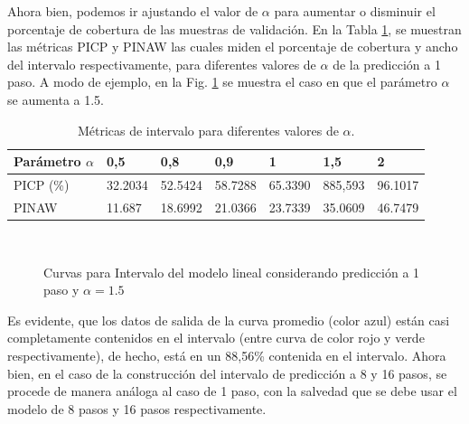 \documentclass[12pt]{article}
\begin{document}
Ahora bien, podemos ir ajustando el valor de $\alpha$ para aumentar o disminuir el porcentaje de cobertura de las muestras de validación. En la Tabla \ref{t_G2}, se muestran las métricas PICP y PINAW las cuales miden el porcentaje de cobertura y ancho del intervalo respectivamente, para diferentes valores de $\alpha$ de la predicción a 1 paso. A modo de ejemplo, en la Fig. \ref{f_G910} se muestra el caso en que el parámetro $\alpha$ se aumenta a 1.5.
\begin{table}[h!]
	\centering
	\caption{Métricas de intervalo para diferentes valores de $\alpha$. }
	\begin{tabular}{|l|l|l|l|l|l|l|}
		\hline
		Parámetro $\alpha$ & 0,5&0,8&0,9&1&1,5&2\\
		\hline
		PICP (\%) & 32.2034 & 52.5424 & 58.7288 & 65.3390 & 885,593 & 96.1017 \\
		\hline
		PINAW & 11.687 & 18.6992 & 21.0366 & 23.7339 & 35.0609 & 46.7479 \\
		\hline
	\end{tabular}%
	\label{t_G2}%
\end{table}
\begin{figure}
		\centering
		\captionsetup{justification=centering}
		\\
		\caption{Curvas para Intervalo del modelo lineal considerando predicción a 1 paso y $\alpha=1.5$}
		\label{f_G910}
\end{figure}
\clearpage
\newpage
Es evidente, que los datos de salida de la curva promedio (color azul) están casi completamente contenidos en el intervalo (entre curva de color rojo y verde respectivamente), de hecho, está en un 88,56\% contenida en el intervalo.
Ahora bien, en el caso de la construcción del intervalo de predicción a 8 y 16 pasos, se procede de manera análoga al caso de 1 paso, con la salvedad que se debe usar el modelo de 8 pasos y 16 pasos respectivamente.
\end{document}
